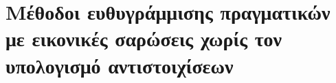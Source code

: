 


\chapter{Μέθοδοι ευθυγράμμισης πραγματικών με εικονικές σαρώσεις χωρίς τον υπολογισμό αντιστοιχίσεων}
  \label{appendix:04}
  

